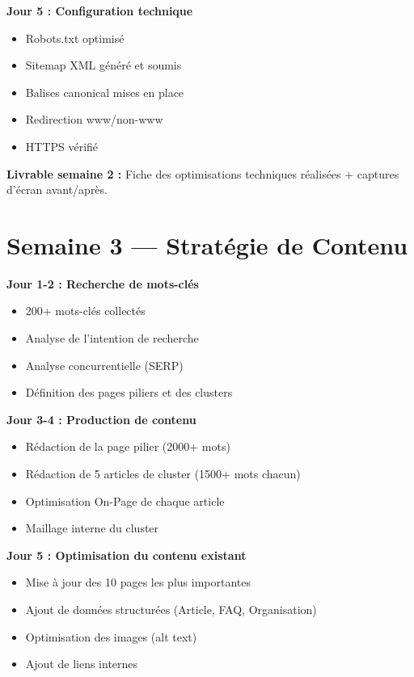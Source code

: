 \documentclass[12pt,a4paper]{report}
\begin{document}
\textbf{Jour 5 : Configuration technique}
\begin{itemize}
\item[$\square$] Robots.txt optimisé
\item[$\square$] Sitemap XML généré et soumis
\item[$\square$] Balises canonical mises en place
\item[$\square$] Redirection www/non-www
\item[$\square$] HTTPS vérifié
\end{itemize}

\textbf{Livrable semaine 2 :}
Fiche des optimisations techniques réalisées + captures d'écran avant/après.

\section{Semaine 3 --- Stratégie de Contenu}

\textbf{Jour 1-2 : Recherche de mots-clés}
\begin{itemize}
\item[$\square$] 200+ mots-clés collectés
\item[$\square$] Analyse de l'intention de recherche
\item[$\square$] Analyse concurrentielle (SERP)
\item[$\square$] Définition des pages piliers et des clusters
\end{itemize}

\textbf{Jour 3-4 : Production de contenu}
\begin{itemize}
\item[$\square$] Rédaction de la page pilier (2000+ mots)
\item[$\square$] Rédaction de 5 articles de cluster (1500+ mots chacun)
\item[$\square$] Optimisation On-Page de chaque article
\item[$\square$] Maillage interne du cluster
\end{itemize}

\textbf{Jour 5 : Optimisation du contenu existant}
\begin{itemize}
\item[$\square$] Mise à jour des 10 pages les plus importantes
\item[$\square$] Ajout de données structurées (Article, FAQ, Organisation)
\item[$\square$] Optimisation des images (alt text)
\item[$\square$] Ajout de liens internes
\end{itemize}
\end{document}
